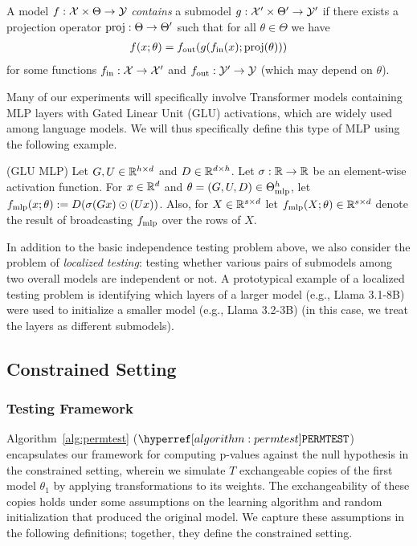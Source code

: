 \begin{definition}\label{defn:submodel}
    A model $f : \mathcal{X} \times \Theta \to \mathcal{Y}$ \textit{contains} a submodel $g : \mathcal{X}' \times \Theta' \to \mathcal{Y}'$ if there exists a projection operator $\textup{proj} : \Theta \to \Theta'$ such that for all $\theta \in \Theta$ we have
\begin{align*}
    f(x;\theta) = f_{\textup{out}}(g(f_{\textup{in}}(x);\textup{proj}(\theta)))
\end{align*}
for some functions $f_{\textup{in}} : \mathcal{X} \to \mathcal{X}'$
and $f_{\textup{out}} : \mathcal{Y}' \to \mathcal{Y}$ (which may depend on $\theta$).
\end{definition}

Many of our experiments will specifically involve Transformer models containing MLP layers with Gated Linear Unit (GLU) activations, which are widely used among language models.
We will thus specifically define this type of MLP using the following example.

\begin{example}\label{example:glu-mlp}
    (GLU MLP)
    Let $G,U \in \mathbb{R}^{h \times d}$ and $D \in \mathbb{R}^{d \times h}$. Let $\sigma : \mathbb{R} \to \mathbb{R}$ be an element-wise activation function. For $x \in \mathbb{R}^d$ and $\theta = (G,U,D) \in \Theta_{\textup{mlp}}^h$, let $f_{\textup{mlp}}(x; \theta) := D ( \sigma(Gx) \odot (Ux) )$. Also, for $X \in \mathbb{R}^{s \times d}$ let $f_{\textup{mlp}}(X ; \theta) \in \mathbb{R}^{s \times d}$ denote the result of broadcasting $f_{\textup{mlp}}$ over the rows of $X$.
\end{example}

In addition to the basic independence testing problem above, we also consider the problem of \textit{localized testing}: testing whether various pairs of submodels among two overall models are independent or not. A prototypical example of a localized testing problem is identifying which layers of a larger model (e.g., Llama 3.1-8B) were used to initialize a smaller model (e.g., Llama 3.2-3B) (in this case, we treat the layers as different submodels).

\subsection{Constrained Setting}

\subsubsection{Testing Framework}

Algorithm~\ref{alg:permtest} ($\permtest$) encapsulates our framework for computing p-values against the null hypothesis in the constrained setting, wherein we simulate $T$ exchangeable copies of the first model $\theta_1$ by applying transformations to its weights. 
The exchangeability of these copies holds under some assumptions on the learning algorithm and random initialization that produced the original model.
We capture these assumptions in the following definitions; together, they define the constrained setting.

